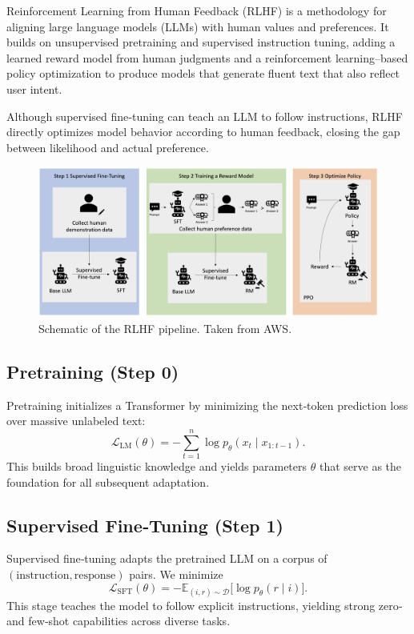\documentclass{article}
\begin{document}
Reinforcement Learning from Human Feedback (RLHF) is a methodology for aligning large language models (LLMs) with human values and preferences. It builds on unsupervised pretraining and supervised instruction tuning, adding a learned reward model from human judgments and a reinforcement learning–based policy optimization to produce models that generate fluent text that also reflect user intent.

Although supervised fine‑tuning can teach an LLM to follow instructions, RLHF directly optimizes model behavior according to human feedback, closing the gap between likelihood and actual preference.

\begin{figure}[ht]
    \centering
    \includegraphics[width=0.95\linewidth]{graphics/S11RLHF/rlhf.jpg}
    \caption{Schematic of the RLHF pipeline. Taken from AWS.}
    \label{fig:rlhf-pipeline}
\end{figure}

\subsection{Pretraining (Step 0)}

Pretraining initializes a Transformer by minimizing the next‑token prediction loss over massive unlabeled text:
\[
  \mathcal{L}_{\mathrm{LM}}(\theta) = -\sum_{t=1}^n \log p_\theta(x_t \mid x_{1:t-1}).
\]
This builds broad linguistic knowledge and yields parameters \(\theta\) that serve as the foundation for all subsequent adaptation.

\subsection{Supervised Fine‑Tuning (Step 1)}

Supervised fine‑tuning adapts the pretrained LLM on a corpus of \((\text{instruction},\text{response})\) pairs.  We minimize
\[
  \mathcal{L}_{\mathrm{SFT}}(\theta) = -\mathbb{E}_{(i,r)\sim\mathcal{D}}\bigl[\log p_\theta(r\mid i)\bigr].
\]
This stage teaches the model to follow explicit instructions, yielding strong zero‑ and few‑shot capabilities across diverse tasks.
\end{document}
